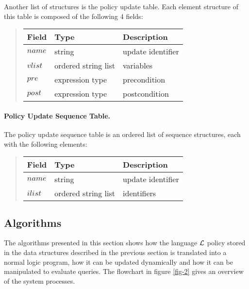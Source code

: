 \documentclass[10pt, twocolumn]{article}
\begin{document}
            Another list of structures is the policy update table. Each element
            structure of this table is composed of the following 4 fields:

            \begin{quote}
              \begin{tabular}[t]{|l|l|l|}
                \hline
                \textbf{Field} & \textbf{Type} & \textbf{Description} \\
                \hline
                $name$ & string & update identifier \\
                \hline
                $vlist$ & ordered string list & variables \\
                \hline
                $pre$ & expression type & precondition \\
                \hline
                $post$ & expression type & postcondition \\
                \hline
              \end{tabular}
            \end{quote}

        \paragraph{Policy Update Sequence Table.}

          The policy update sequence table is an ordered list of sequence
          structures, each with the following elements:

          \begin{quote}
            \begin{tabular}[t]{|l|l|l|}
              \hline
              \textbf{Field} & \textbf{Type} & \textbf{Description} \\
              \hline
              $name$ & string & update identifier \\
              \hline
              $ilist$ & ordered string list & identifiers \\
              \hline
            \end{tabular}
          \end{quote}

    \subsection{Algorithms}

      The algorithms presented in this section shows how the language
      ${\cal L}$ policy stored in the data structures described in the previous
      section is translated into a normal logic program, how it can be updated
      dynamically and how it can be manipulated to evaluate queries. The
      flowchart in figure \ref{fig-2} gives an overview of the system
      processes.
\end{document}
